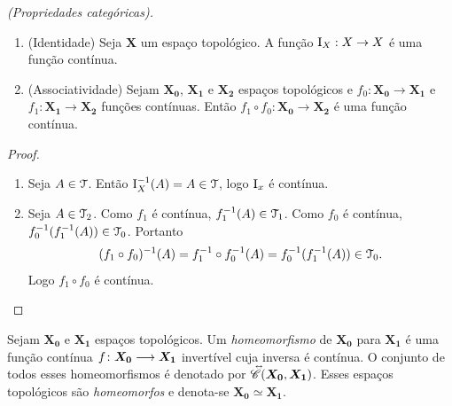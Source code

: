 \begin{proposition}\emph{(Propriedades categóricas).}
\begin{enumerate}
	\item (Identidade) Seja $\bm X$ um espaço topológico. A função $\mathrm{I}_X: X \to X$ é uma função contínua.
	\item (Associatividade) Sejam $\bm{X_0}$, $\bm{X_1}$ e $\bm{X_2}$ espaços topológicos e $f_0: \bm{X_0} \to \bm{X_1}$ e $f_1: \bm{X_1} \to \bm{X_2}$ funções contínuas. Então $f_1 \circ f_0: \bm{X_0} \to \bm{X_2}$ é uma função contínua.
\begin{figure}
\centering
{}
\end{figure}
	\end{enumerate}
\end{proposition}
\begin{proof}
\begin{enumerate}
	\item Seja $A \in \mathcal{T}$. Então $\mathrm{I}_X^{-1}(A)=A \in \mathcal{T}$, logo $\mathrm{I}_x$ é contínua.
	
	\item Seja $A \in \mathcal{T}_2$. Como $f_1$ é contínua, $f_1^{-1}(A) \in \mathcal{T}_1$. Como $f_0$ é contínua, $f_0^{-1}(f_1^{-1}(A)) \in \mathcal{T}_0$. Portanto
		\begin{equation*}
		(f_1 \circ f_0)^{-1}(A) = f_1^{-1} \circ f_0^{-1} (A) = f_0^{-1}(f_1^{-1}(A)) \in \mathcal{T}_0.
		\end{equation*}
	Logo $f_1 \circ f_0$ é contínua. \qedhere
\end{enumerate}
\end{proof}

\begin{definition}
Sejam $\bm{X_0}$ e $\bm{X_1}$ espaços topológicos. Um \emph{homeomorfismo} de $\bm{X_0}$ para $\bm{X_1}$ é uma função contínua ${f}\colon {\bm{X_0}} \longrightarrow {\bm{X_1}}$ invertível cuja inversa é contínua. O conjunto de todos esses homeomorfismos é denotado por $\accentset{\leftrightarrow}{\mathscr{C}}(\bm{X_0},\bm{X_1})$.
Esses espaços topológicos são \emph{homeomorfos} e denota-se $\bm{X_0} \simeq \bm{X_1}$.
\end{definition}

